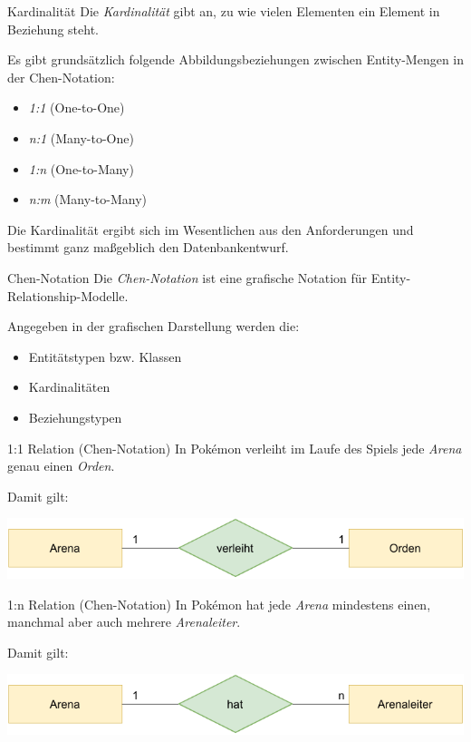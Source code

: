 \begin{defi}{Kardinalität}
    Die \emph{Kardinalität} gibt an, zu wie vielen Elementen ein Element in Beziehung steht.

    Es gibt grundsätzlich folgende Abbildungsbeziehungen zwischen Entity-Mengen in der Chen-Notation:
    \begin{itemize}
        \item \emph{1:1} (One-to-One)
        \item \emph{n:1} (Many-to-One)
        \item \emph{1:n} (One-to-Many)
        \item \emph{n:m} (Many-to-Many)
    \end{itemize}

    Die Kardinalität ergibt sich im Wesentlichen aus den Anforderungen und bestimmt ganz maßgeblich den Datenbankentwurf.
\end{defi}

\begin{defi}{Chen-Notation}
    Die \emph{Chen-Notation} ist eine grafische Notation für Entity-Relationship-Modelle.

    Angegeben in der grafischen Darstellung werden die:
    \begin{itemize}
        \item Entitätstypen bzw. Klassen
        \item Kardinalitäten
        \item Beziehungstypen
    \end{itemize}
\end{defi}

\begin{example}{1:1 Relation (Chen-Notation)}
    In Pokémon verleiht im Laufe des Spiels jede \emph{Arena} genau einen \emph{Orden}.

    Damit gilt:
    \begin{center}
        \includegraphics[width=0.7\linewidth]{includes/figures/example_entity_relationship_modell_chen_one_to_one.pdf}
    \end{center}
\end{example}

\begin{example}{1:n Relation (Chen-Notation)}
    In Pokémon hat jede \emph{Arena} mindestens einen, manchmal aber auch mehrere \emph{Arenaleiter}.

    Damit gilt:
    \begin{center}
        \includegraphics[width=0.7\linewidth]{includes/figures/example_entity_relationship_modell_chen_one_to_many.pdf}
    \end{center}
\end{example}

